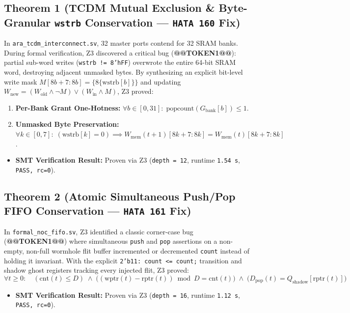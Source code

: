 \documentclass[journal,10pt,twocolumn]{IEEEtran}
\begin{document}
\subsection{Theorem 1 (TCDM Mutual Exclusion \& Byte-Granular \texttt{wstrb} Conservation — \texttt{HATA 160} Fix)}
In \texttt{ara\_tcdm\_interconnect.sv}, 32 master ports contend for 32 SRAM banks. During formal verification, Z3 discovered a critical bug (\textbf{@@TOKEN1@@}): partial sub-word writes (\texttt{wstrb != 8'hFF}) overwrote the entire 64-bit SRAM word, destroying adjacent unmasked bytes. By synthesizing an explicit bit-level write mask $M[8b+7:8b] = \{8\{\mathrm{wstrb}[b]\}\}$ and updating $W_{\mathrm{new}} = (W_{\mathrm{old}} \wedge \neg M) \vee (W_{\mathrm{in}} \wedge M)$, Z3 proved:
\begin{enumerate}
  \item \textbf{Per-Bank Grant One-Hotness:} $\forall b \in [0,31]:\; \mathrm{popcount}(G_{\mathrm{bank}}[b]) \le 1$.
  \item \textbf{Unmasked Byte Preservation:} $\forall k \in [0,7]:\; (\mathrm{wstrb}[k] = 0) \implies W_{\mathrm{mem}}(t+1)[8k+7:8k] = W_{\mathrm{mem}}(t)[8k+7:8k]$.
\end{enumerate}

\begin{itemize}
  \item \textbf{SMT Verification Result:} Proven via Z3 (\texttt{depth = 12}, runtime \texttt{1.54 s}, \texttt{PASS, rc=0}).
\end{itemize}

\subsection{Theorem 2 (Atomic Simultaneous Push/Pop FIFO Conservation — \texttt{HATA 161} Fix)}
In \texttt{formal\_noc\_fifo.sv}, Z3 identified a classic corner-case bug (\textbf{@@TOKEN1@@}) where simultaneous \texttt{push} and \texttt{pop} assertions on a non-empty, non-full wormhole flit buffer incremented or decremented \texttt{count} instead of holding it invariant. With the explicit \texttt{2'b11: count <= count;} transition and shadow ghost registers tracking every injected flit, Z3 proved:
$$\forall t \ge 0:\quad (\mathrm{cnt}(t) \le D) \;\wedge\; \Big((\mathrm{wptr}(t) - \mathrm{rptr}(t)) \bmod D = \mathrm{cnt}(t)\Big) \;\wedge\; \big(D_{\mathrm{pop}}(t) = Q_{\mathrm{shadow}}[\mathrm{rptr}(t)]\big)$$

\begin{itemize}
  \item \textbf{SMT Verification Result:} Proven via Z3 (\texttt{depth = 16}, runtime \texttt{1.12 s}, \texttt{PASS, rc=0}).
\end{itemize}
\end{document}
